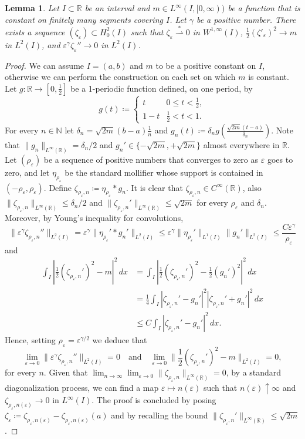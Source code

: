 \documentclass[a4, 11pt, reqno, final]{amsart}
\newcommand\e{\varepsilon}
\newcommand\weakstar{\stackrel{\ast }{\rightharpoonup}}  %
\theoremstyle{plain}%
\newtheorem{lemma}[theorem]{Lemma}
\newcommand{\QED}{\hspace{1ex}\hfill$\blacksquare$\vspace{2ex}}
\begin{document}
	\begin{lemma}\label{lemmazeta}
		Let $I\subset\mathbb{R}$ be an interval and $m \in L^\infty(I, [0,\infty))$ be a function that is constant on finitely many segments  covering $I$. Let $\gamma$ be a positive number. There exists a sequence $(\zeta_\e) \subset H^2_0(I)$ such that $\zeta_\e \weakstar 0$ in $W^{1,\infty}(I)$, $\frac12(\zeta'_\e)^2 \to m$ in $L^2(I)$, and $\e^\gamma \zeta_\e'' \to 0$ in $L^2(I)$.
	\end{lemma}
	\begin{proof}
		We can assume $I=(a,b)$ and $m$ to be a positive constant on $I$, otherwise we can perform the construction on each set on which $m$ is constant. \\
		Let  $g:\mathbb{R} \to [0,\frac12]$ be a 1-periodic function defined, on one period, by
		$$ g(t) \coloneqq  \begin{cases}
			t & 0\leq t < \frac12,\\
			1-t & \frac12<t	<1.
		\end{cases}$$
		For every $n\in\mathbb{N}$ let	$\delta_n = \sqrt{2m}(b-a)\frac1n$ and $g_{n}(t) \coloneqq  \delta_n g (\frac{\sqrt{2m} (t-a) }{\delta_n})$.
		Note that $\|g_n\|_{L^\infty(\mathbb{R} )}=\delta_n/2$ and $g_{n}'\in\{- \sqrt{2m},+\sqrt{2m}\}$ almost everywhere in $\mathbb{R}$.
		Let $(\rho_\e)$ be a sequence of positive numbers that converges to zero as $\e$ goes to zero, and let  $\eta_{\rho_\e}$ be the standard mollifier whose support is contained in $(-\rho_\e,\rho_\e)$.
		Define $\zeta_{\rho_\e,n}\coloneqq  \eta_{\rho_\e}\ast g_{n}$. It is clear that $\zeta_{\rho_\e,n} \in C^\infty(\mathbb{R})$, also $\|\zeta_{\rho_\e,n}\|_{L^\infty(\mathbb{R} )}\le\delta_n/2$ and $\|\zeta_{\rho_\e,n}'\|_{L^\infty(\mathbb{R} )}\le \sqrt{2m}$ for every $\rho_\e$ and $\delta_n$. Moreover, by Young's inequality for convolutions,
		$$\|\e^\gamma \zeta_{\rho_\e,n}''\|_{L^2(I)}=\e^\gamma \|\eta_{\rho_\e}'\ast g_{n}'\|_{L^2(I)}\le \e^\gamma
		\|\eta_{\rho_\e}'\|_{L^1(I)} \|g_{n}'\|_{L^2(I)}\le\frac{C\e^\gamma }{\rho_\e}
		$$
		and
		$$
		\begin{aligned}
			\int_I |\frac 12 (\zeta_{\rho_\e,n}')^2 -m |^2\,dx&=\int_I |\frac 12 (\zeta_{\rho_\e,n}')^2 -\frac 12 (g_{n}')^2 |^2\,dx\\
			&=\frac 14 \int_I |\zeta_{\rho_\e,n}' -g_{n}' |^2|\zeta_{\rho_\e,n}' +g_{n}' |^2\,dx\\
			&\le C \int_I |\zeta_{\rho_\e,n}' -g_{n}' |^2\,dx.
		\end{aligned}
		$$
		Hence, setting $\rho_\e=\e^{\gamma/2}$ we deduce that
		$$\lim_{\e\to 0}\|\e^\gamma \zeta_{\rho_\e,n}''\|_{L^2(I)}=0
		\quad \mbox{and}\quad
		\lim_{\e\to 0}\|\frac 12 (\zeta_{\rho_\e,n}')^2 -m \|_{L^2(I)}=0,
		$$
		for every $n$. Given that $\lim_{n\to \infty}\lim_{\e\to 0} \|\zeta_{\rho_\e,n}\|_{L^\infty(\mathbb{R} )}=0$, by a
		standard diagonalization process, we can find a map $\e \mapsto n(\e)$ such that $n(\e)\uparrow \infty$ and
		$\zeta_{\rho_\e,n(\e)} \to 0$ in $L^\infty(I)$. The proof is concluded by posing $\zeta_\e\coloneqq \zeta_{\rho_\e,n(\e)} - \zeta_{\rho_\e,n(\e)}(a)$ and by recalling the bound $\|\zeta_{\rho_\e,n}'\|_{L^\infty(\mathbb{R} )}\le \sqrt{2m}$.
	\end{proof}
\end{document}
